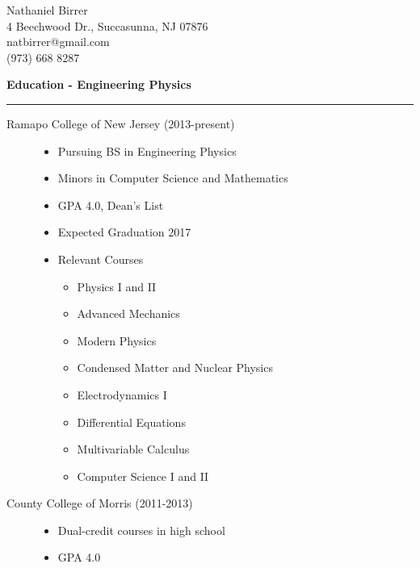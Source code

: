 \documentclass[letterpaper,10pt]{article}
\begin{document}
 \begin{center}
  \Large
  Nathaniel Birrer \\
  \normalsize
  4 Beechwood Dr., Succasunna, NJ 07876 \\
  natbirrer@gmail.com \\
  (973) 668 8287 \\
 \end{center}
 
 \large
 \textbf{Education - Engineering Physics}
 \vspace{1 mm}
 \hrule
 \normalsize
 
 \begin{description}
 
   \item[Ramapo College of New Jersey (2013-present)] \hfill
   \begin{itemize}
    \item Pursuing BS in Engineering Physics
    \item Minors in Computer Science and Mathematics
    \item GPA 4.0, Dean's List
    \item Expected Graduation 2017
    \item Relevant Courses \hfill
     \begin{multicols}{2}
      \begin{itemize}
      \item Physics I and II
      \item Advanced Mechanics
      \item Modern Physics
      \item Condensed Matter and Nuclear Physics
      \item Electrodynamics I
      \item Differential Equations
      \item Multivariable Calculus
      \item Computer Science I and II
      \end{itemize}
     \end{multicols}
   \end{itemize}

   \item[County College of Morris (2011-2013)] \hfill
   \begin{itemize}
    \item Dual-credit courses in high school
    \item GPA 4.0
   \end{itemize}

 \end{description}
 
\end{document}
